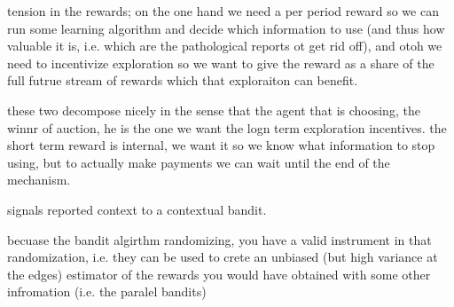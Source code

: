 


tension in the rewards; on the one hand we need a per period reward so we can run some learning algorithm and decide which information to use (and thus how valuable it is, i.e. which are the pathological reports ot get rid off), and otoh we need to incentivize exploration so we want to give the reward as a share of the full futrue stream of rewards which that exploraiton can benefit.

these two decompose nicely in the sense that the agent that is choosing, the winnr of auction, he is the one we want the logn term exploration incentives. the short term reward is internal, we want it so we know what information to stop using, but to actually make payments we can wait until the end of the mechanism.


signals reported context to a contextual bandit.

becuase the bandit algirthm randomizing, you have a valid instrument in that randomization, i.e. they can be used to crete an unbiased (but high variance at the edges) estimator of the rewards you would have obtained with some other infromation (i.e. the paralel bandits)
